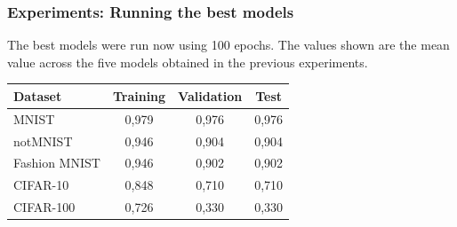 \documentclass[aspectratio=169]{beamer}
\begin{document}
		\begin{frame}
			\frametitle{Experiments: Running the best models}
			
			The best models were run now using 100 epochs. The values shown are the mean value across the five models obtained in the previous experiments.
			
			\begin{table}
				\begin{tabular}{l|c|c|c}
					\hline
					   Dataset    & Training & Validation & Test  \\ \hline
					    MNIST     &  0,979   &   0,976    & 0,976 \\
					  notMNIST    &  0,946   &   0,904    & 0,904 \\
					Fashion MNIST &  0,946   &   0,902    & 0,902 \\
					  CIFAR-10    &  0,848   &   0,710    & 0,710 \\
					  CIFAR-100   &  0,726   &   0,330    & 0,330 \\ \hline
				\end{tabular}
			\end{table}
		
		\end{frame}
\end{document}
